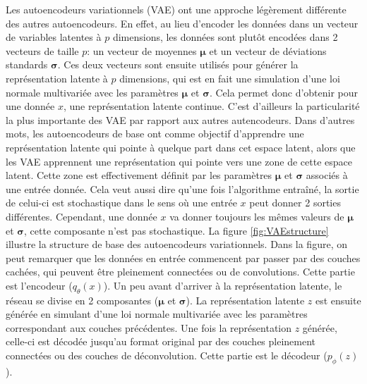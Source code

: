 Les autoencodeurs variationnels (VAE)  \cite{kingma2013autoencoding} ont une approche légèrement différente des autres autoencodeurs. En effet, au lieu d'encoder les données dans un vecteur de variables latentes à $p$ dimensions, les données sont plutôt encodées dans 2 vecteurs de taille $p$: un vecteur de moyennes $\boldsymbol \mu$ et un vecteur de déviations standards $\boldsymbol \sigma$. Ces deux vecteurs sont ensuite utilisés pour générer la représentation latente à $p$ dimensions, qui est en fait une simulation d'une loi normale multivariée avec les paramètres $\boldsymbol \mu$ et $\boldsymbol \sigma$. Cela permet donc d'obtenir pour une donnée $x$, une représentation latente continue. C'est d'ailleurs la particularité la plus importante des VAE par rapport aux autres autencodeurs. Dans d'autres mots, les autoencodeurs de base ont comme objectif d'apprendre une représentation latente qui pointe à quelque part dans cet espace latent, alors que les VAE apprennent une représentation qui pointe vers une zone de cette espace latent. Cette zone est effectivement définit par les paramètres $\boldsymbol \mu$ et $\boldsymbol \sigma$ associés à une entrée donnée. Cela veut aussi dire qu'une fois l'algorithme entraîné, la sortie  de celui-ci est stochastique dans le sens où une entrée $x$ peut donner 2 sorties différentes. Cependant, une donnée $x$ va donner toujours les mêmes valeurs de $\boldsymbol \mu$ et $\boldsymbol \sigma$, cette composante n'est pas stochastique. La figure \ref{fig:VAEstructure} illustre la structure de base des autoencodeurs variationnels. Dans la figure, on peut remarquer que les données en entrée commencent par passer par des couches cachées, qui peuvent être pleinement connectées ou de convolutions. Cette partie est l'encodeur ($q_{\theta}(x)$). Un peu avant d'arriver à la représentation latente, le réseau se divise en 2 composantes ($\boldsymbol \mu$ et $\boldsymbol \sigma$). La représentation latente $z$ est ensuite générée en simulant d'une loi normale multivariée avec les paramètres correspondant aux couches précédentes. Une fois la représentation $z$ générée, celle-ci est décodée jusqu'au format original par des couches pleinement connectées ou des couches de déconvolution. Cette partie est le décodeur ($p_{\phi}(z)$).

